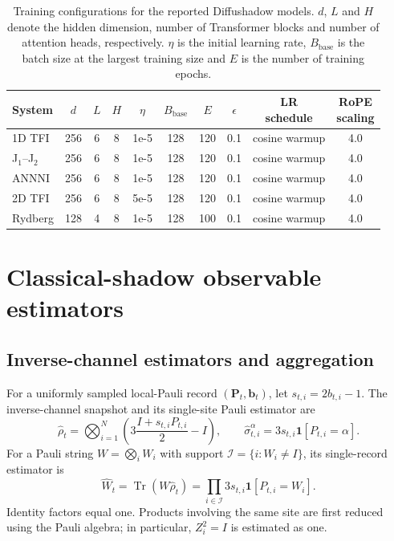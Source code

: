 \documentclass[11pt,a4paper]{article}
\newcommand{\ind}{\mathbf{1}}
\newcommand{\sechead}[2]{\section{#2}}
\newcommand{\subhead}[1]{\subsection*{#1}}
\begin{document}
\begin{table}[htbp]
\centering
\small
\caption{Training configurations for the reported Diffushadow models.
$d$, $L$ and $H$ denote the hidden dimension, number of Transformer
blocks and number of attention heads, respectively. $\eta$ is the
initial learning rate, $B_{\mathrm{base}}$ is the batch size at the
largest training size and $E$ is the number of training epochs.}
\label{tab:s2_training_configurations}
\begin{tabular}{lccccccccc}
\hline
System
& $d$
& $L$
& $H$
& $\eta$
& $B_{\mathrm{base}}$
& $E$
& $\epsilon$
& \shortstack{LR\\schedule}
& \shortstack{RoPE\\scaling} \\
\hline
1D TFI
& 256 & 6 & 8
& 1e-5
& 128
& 120
& 0.1
& cosine warmup
& 4.0 \\

J$_1$--J$_2$
& 256 & 6 & 8
& 1e-5
& 128
& 120
& 0.1
& cosine warmup
& 4.0 \\

ANNNI
& 256 & 6 & 8
& 1e-5
& 128
& 120
& 0.1
& cosine warmup
& 4.0 \\

2D TFI
& 256
& 6
& 8
& 5e-5
& 128
& 120
& 0.1
& cosine warmup
& 4.0 \\

Rydberg
& 128
& 4
& 8
& 1e-5
& 128
& 100
& 0.1
& cosine warmup
& 4.0 \\
\hline
\end{tabular}
\end{table}



\sechead{S3}{Classical-shadow observable estimators}
\label{supp:shadow_estimators}

\subhead{Inverse-channel estimators and aggregation}
For a uniformly sampled local-Pauli record
$(\mathbf{P}_t,\mathbf{b}_t)$, let $s_{t,i}=2b_{t,i}-1$.
The inverse-channel snapshot and its single-site Pauli estimator
are~\cite{huang2020predicting}
\begin{equation}
\widehat{\rho}_t
=
\bigotimes_{i=1}^{N}
\left(3\frac{I+s_{t,i}P_{t,i}}{2}-I\right),
\qquad
\widehat{\sigma}^{\alpha}_{t,i}
=
3s_{t,i}\ind[P_{t,i}=\alpha].
\label{supp:eq:local_shadow}
\end{equation}
For a Pauli string $W=\bigotimes_iW_i$ with support
$\mathcal{I}=\{i:W_i\ne I\}$, its single-record estimator is
\begin{equation}
\widehat{W}_t
=
\operatorname{Tr}(W\widehat{\rho}_t)
=
\prod_{i\in\mathcal{I}}
3s_{t,i}\ind[P_{t,i}=W_i].
\label{supp:eq:pauli_string}
\end{equation}
Identity factors equal one. Products involving the same site are
first reduced using the Pauli algebra; in particular, $Z_i^2=I$
is estimated as one.
\end{document}
